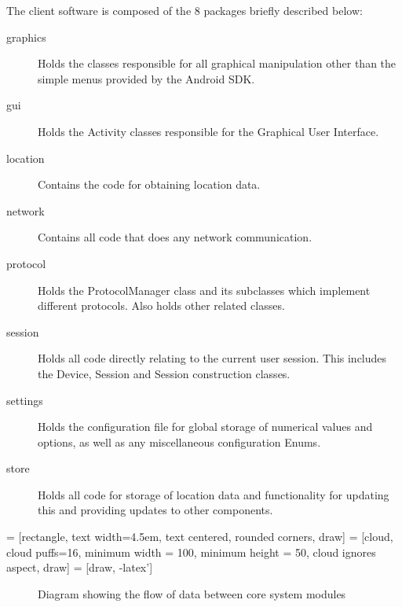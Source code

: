 The client software is composed of the 8 packages briefly described below:
\begin{description}
\item[graphics]{Holds the classes responsible for all graphical manipulation other than the simple menus provided by the Android SDK.}
\item[gui]{Holds the Activity classes responsible for the Graphical User Interface.}
\item[location]{Contains the code for obtaining location data.}
\item[network]{Contains all code that does any network communication.}
\item[protocol]{Holds the ProtocolManager class and its subclasses which implement different protocols. Also holds other related classes.}
\item[session]{Holds all code directly relating to the current user session. This includes the Device, Session and Session construction classes.}
\item[settings]{Holds the configuration file for global storage of numerical values and options, as well as any miscellaneous configuration Enums.}
\item[store]{Holds all code for storage of location data and functionality for updating this and providing updates to other components.}
\end{description}

 = [rectangle, text width=4.5em, text centered, rounded corners, draw]
 = [cloud, cloud puffs=16, minimum width = 100, minimum height = 50, cloud ignores aspect, draw]
 = [draw, -latex']
\begin{figure}[ht]
\centering
{}
\caption{Diagram showing the flow of data between core system modules}
\label{fig:dataflow}
\end{figure}

